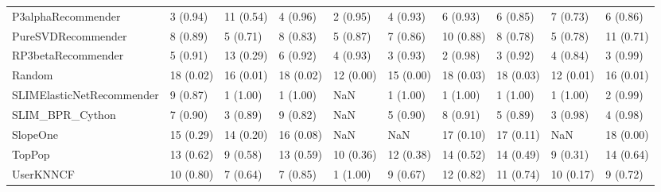 \begin{tabular}{llllllllll}
                 P3alphaRecommender &                 3 (0.94) &   11 (0.54) &      4 (0.96) &     2 (0.95) &             4 (0.93) &            6 (0.93) &          6 (0.85) &           7 (0.73) &          6 (0.86) \\
                 PureSVDRecommender &                 8 (0.89) &    5 (0.71) &      8 (0.83) &     5 (0.87) &             7 (0.86) &           10 (0.88) &          8 (0.78) &           5 (0.78) &         11 (0.71) \\
                 RP3betaRecommender &                 5 (0.91) &   13 (0.29) &      6 (0.92) &     4 (0.93) &             3 (0.93) &            2 (0.98) &          3 (0.92) &           4 (0.84) &          3 (0.99) \\
                             Random &                18 (0.02) &   16 (0.01) &     18 (0.02) &    12 (0.00) &            15 (0.00) &           18 (0.03) &         18 (0.03) &          12 (0.01) &         16 (0.01) \\
          SLIMElasticNetRecommender &                 9 (0.87) &    1 (1.00) &      1 (1.00) &          NaN &             1 (1.00) &            1 (1.00) &          1 (1.00) &           1 (1.00) &          2 (0.99) \\
                    SLIM\_BPR\_Cython &                 7 (0.90) &    3 (0.89) &      9 (0.82) &          NaN &             5 (0.90) &            8 (0.91) &          5 (0.89) &           3 (0.98) &          4 (0.98) \\
                           SlopeOne &                15 (0.29) &   14 (0.20) &     16 (0.08) &          NaN &                  NaN &           17 (0.10) &         17 (0.11) &                NaN &         18 (0.00) \\
                             TopPop &                13 (0.62) &    9 (0.58) &     13 (0.59) &    10 (0.36) &            12 (0.38) &           14 (0.52) &         14 (0.49) &           9 (0.31) &         14 (0.64) \\
                          UserKNNCF &                10 (0.80) &    7 (0.64) &      7 (0.85) &     1 (1.00) &             9 (0.67) &           12 (0.82) &         11 (0.74) &          10 (0.17) &          9 (0.72) \\
\bottomrule
\end{tabular}
